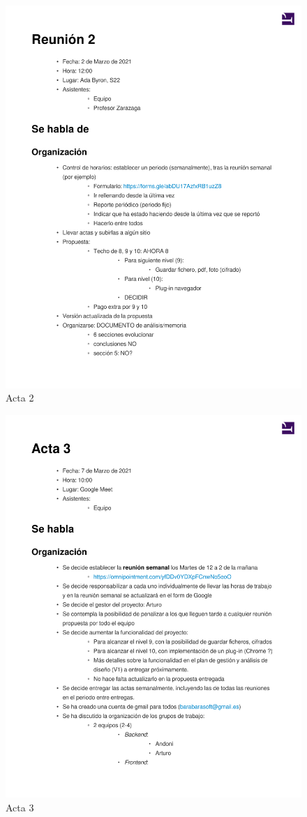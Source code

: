 \documentclass{article}
\begin{document}
\begin{figure}
   \includegraphics[width=.8\textwidth]{../../actas_reuniones/acta2.pdf}
   \caption{Acta 2}
\end{figure}
\begin{figure}
   \includegraphics[width=.8\textwidth]{../../actas_reuniones/acta3.pdf}
   \caption{Acta 3}
\end{figure}
\end{document}
